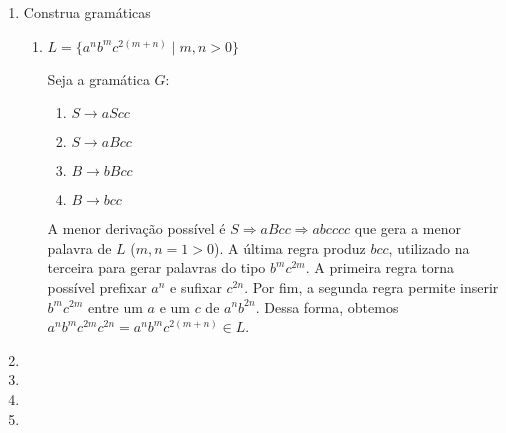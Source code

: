 \documentclass[brazil, a4paper,12pt]{article}
\begin{document}
\begin{enumerate}

\item Construa gramáticas
  \begin{enumerate}
    \item $L = \{a^nb^mc^{2(m+n)} \mid m, n > 0\}$

    Seja a gramática $G$:

    \begin{enumerate}
      \item $S \rightarrow aScc$ \label{regra1a1}
      \item $S \rightarrow aBcc$ \label{regra1a2}
      \item $B \rightarrow bBcc$ \label{regra1a3}
      \item $B \rightarrow bcc$ \label{regra1a4}
    \end{enumerate}

    A menor derivação possível é $S \Rightarrow aBcc \Rightarrow abcccc$ que
    gera a menor palavra de $L$ ($m, n = 1 > 0$). A última regra produz
    $bcc$, utilizado na terceira para gerar palavras do tipo $b^mc^{2m}$. A
    primeira regra torna possível prefixar $a^n$ e sufixar $c^{2n}$. Por
    fim, a segunda regra permite inserir $b^mc^{2m}$ entre um $a$ e um $c$
    de $a^nb^{2n}$. Dessa forma, obtemos $a^nb^mc^{2m}c^{2n} =
    a^nb^mc^{2(m+n)} \in L$.

  \end{enumerate}

\item

\item

\item

\item

\end{enumerate}
\end{document}
